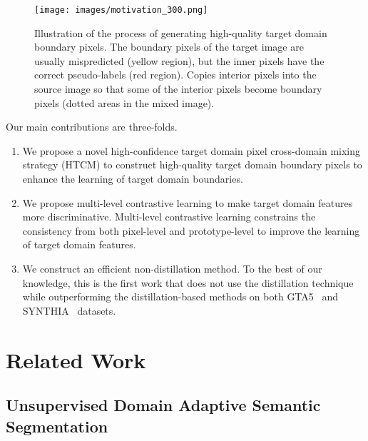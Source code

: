 \documentclass[sigconf]{acmart}
\begin{document}
		\begin{figure}
			\centering
			\texttt{[image: images/motivation\_300.png]}
			\vspace{-0.25cm}
			\caption{Illustration of the process of generating high-quality target domain boundary pixels. The boundary pixels of the target image are usually mispredicted (yellow region), but the inner pixels have the correct pseudo-labels (red region). Copies interior pixels into the source image so that some of the interior pixels become boundary pixels (dotted areas in the mixed image).}
			\label{figure:motivation}
\end{figure}	
Our main contributions are three-folds. 
		\begin{enumerate}
			\item We propose a novel high-confidence target domain pixel cross-domain mixing strategy (HTCM) to construct high-quality target domain boundary pixels to enhance the learning of target domain boundaries. 
			
			\item We propose multi-level contrastive learning to make target domain features more discriminative. Multi-level contrastive learning constrains the consistency from both pixel-level and prototype-level to improve the learning of target domain features.
			
			\item We construct an efficient non-distillation method. To the best of our knowledge, this is the first work that does not use the distillation technique while outperforming the distillation-based methods on both GTA5~\cite{richter2016playing} and SYNTHIA~\cite{ros2016synthia} datasets.
		\end{enumerate}
		
		\section{Related Work}
		\subsection{Unsupervised Domain Adaptive Semantic Segmentation}
		
\end{document}
